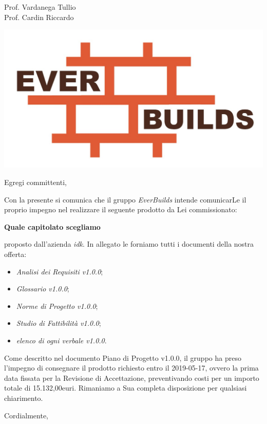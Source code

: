 \documentclass[12pt]{letter}
\date{14 Gennaio 2021}
\begin{document}
\begin{letter}
{
	Prof. Vardanega Tullio \\
 	Prof. Cardin Riccardo
}


\includegraphics[scale=0.17]{images/logo.png}

\opening{Egregi committenti,}

Con la presente si comunica che il gruppo
\textit{EverBuilds} intende comunicarLe il proprio 
impegno nel realizzare il seguente prodotto da Lei
commissionato:

\textbf{Quale capitolato scegliamo}

proposto dall'azienda \textit{idk}. In allegato 
le forniamo tutti i documenti della nostra offerta:

\begin{itemize}
	\item \textit{Analisi dei Requisiti v1.0.0};
	\item \textit{Glossario v1.0.0};
	\item \textit{Norme di Progetto v1.0.0};
	\item \textit{Studio di Fattibilità v1.0.0};
	\item \textit{elenco di ogni verbale v1.0.0}.
\end{itemize}

\newpage

Come descritto nel documento Piano di Progetto v1.0.0,
il gruppo ha preso l'impegno di consegnare il
prodotto richiesto entro il 2019-05-17, ovvero la prima data fissata per la Revisione di Accettazione, preventivando costi per un importo totale di 15.132,00euri. Rimaniamo a Sua completa disposizione per qualsiasi chiarimento.


\closing{Cordialmente,}

\end{letter}
\end{document}
